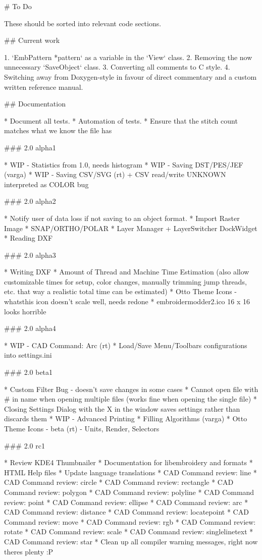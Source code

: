 # To Do

These should be sorted into relevant code sections.

## Current work

1. `EmbPattern *pattern` as a variable in the `View` class.
2. Removing the now unnecessary `SaveObject` class.
3. Converting all comments to C style.
4. Switching away from Doxygen-style in favour of direct commentary and a custom written reference manual.

## Documentation

* Document all tests.
* Automation of tests.
* Ensure that the stitch count matches what we know the file has

### 2.0 alpha1

* WIP - Statistics from 1.0, needs histogram
* WIP - Saving DST/PES/JEF (varga)
* WIP - Saving CSV/SVG (rt) + CSV read/write UNKNOWN interpreted as COLOR bug

### 2.0 alpha2

* Notify user of data loss if not saving to an object format.
* Import Raster Image
* SNAP/ORTHO/POLAR
* Layer Manager + LayerSwitcher DockWidget
* Reading DXF

### 2.0 alpha3

* Writing DXF
* Amount of Thread and Machine Time Estimation (also allow customizable times for setup, color changes, manually trimming jump threads, etc. that way a realistic total time can be estimated)
* Otto Theme Icons - whatsthis icon doesn't scale well, needs redone
* embroidermodder2.ico 16 x 16 looks horrible

### 2.0 alpha4

* WIP - CAD Command: Arc (rt)
* Load/Save Menu/Toolbars configurations into settings.ini

### 2.0 beta1

* Custom Filter Bug - doesn't save changes in some cases
* Cannot open file with \# in name when opening multiple files (works fine when opening the single file)
* Closing Settings Dialog with the X in the window saves settings rather than discards them
* WIP - Advanced Printing
* Filling Algorithms (varga)
* Otto Theme Icons - beta (rt) - Units, Render, Selectors

### 2.0 rc1

* Review KDE4 Thumbnailer
* Documentation for libembroidery and formats
* HTML Help files
* Update language translations
* CAD Command review: line
* CAD Command review: circle
* CAD Command review: rectangle
* CAD Command review: polygon
* CAD Command review: polyline
* CAD Command review: point
* CAD Command review: ellipse
* CAD Command review: arc
* CAD Command review: distance
* CAD Command review: locatepoint
* CAD Command review: move
* CAD Command review: rgb
* CAD Command review: rotate
* CAD Command review: scale
* CAD Command review: singlelinetext
* CAD Command review: star
* Clean up all compiler warning messages, right now theres plenty :P

